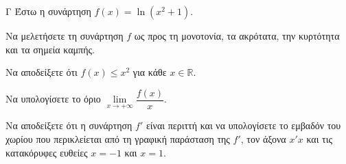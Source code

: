 \begin{thema}{Γ}
Έστω η συνάρτηση $f(x) = \ln(x^2 + 1)$.
\begin{erwthma}
  \item Να μελετήσετε τη συνάρτηση $f$ ως προς τη μονοτονία, τα ακρότατα, την κυρτότητα και τα σημεία καμπής.
  \item Να αποδείξετε ότι $f(x) \le x^2$ για κάθε $x \in \mathbb{R}$.
  \item Να υπολογίσετε το όριο $\lim\limits_{x \to +\infty} \dfrac{f(x)}{x}$.
  \item Να αποδείξετε ότι η συνάρτηση $f'$ είναι περιττή και να υπολογίσετε το εμβαδόν του χωρίου που περικλείεται από τη γραφική παράσταση της $f'$, τον άξονα $x'x$ και τις κατακόρυφες ευθείες $x=-1$ και $x=1$.
\end{erwthma}
\end{thema}
